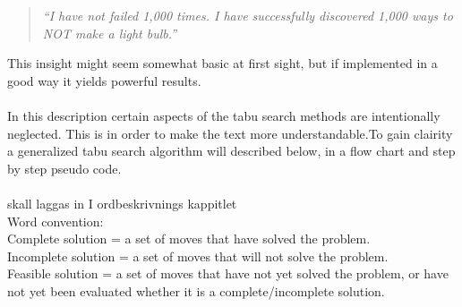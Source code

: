 \begin{quotation}
\emph{``I have not failed 1,000 times.  I have
successfully discovered 1,000 ways to NOT make a light bulb.''}
\end{quotation}


This insight might seem somewhat basic at first sight, but if implemented in a good way it yields powerful results.\\
\\In this description certain aspects of the tabu search methods are intentionally neglected. This is in order to make the text more understandable.To gain clairity a generalized tabu search algorithm will described below, in a flow chart and step by step pseudo code.\\
\\
skall laggas in I ordbeskrivnings kappitlet\\
Word convention:\\ 
Complete solution = a set of moves that have solved the problem.\\
Incomplete solution = a set of moves that will not solve the problem.\\
Feasible solution = a set of moves that have not yet solved the problem, or have not yet been evaluated whether it is a complete/incomplete solution.\\
